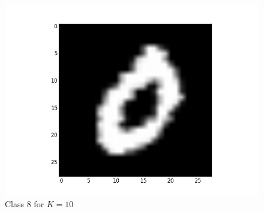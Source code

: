 \documentclass[submit]{harvardml}
\begin{document}
\begin{figure}[ht]
    \includegraphics[scale=0.20]{representative-7-2}
    \caption{Class 8 for $K=10$}
\end{figure}
\end{document}
